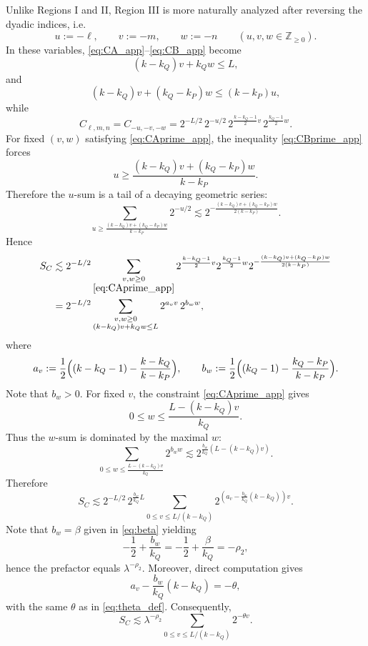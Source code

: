 \documentclass[10pt]{amsart}
\numberwithin{equation}{section}
\theoremstyle{definition}
\theoremstyle{remark}
\theoremstyle{remark}
\newcommand{\Z}{\mathbb{Z}}
\begin{document}
	Unlike Regions I and II,
    Region III is more naturally analyzed after reversing the dyadic indices, i.e.
	\[
	u:=-\ell,\qquad v:=-m,\qquad w:=-n\qquad(u,v,w\in\Z_{\ge 0}).
	\]
	In these variables, \eqref{eq:CA_app}--\eqref{eq:CB_app} become
	\begin{equation}\label{eq:CAprime_app}
		(k-k_Q)v+k_Q w\le L,
	\end{equation}
	and
	\begin{equation}\label{eq:CBprime_app}
		(k-k_Q)v+(k_Q-k_P)w\le (k-k_P)u,
	\end{equation}
	while
	\[
	C_{\ell,m,n}=C_{-u,-v,-w}
	=
	2^{-L/2}\,2^{-u/2}\,
	2^{\frac{k-k_Q-1}{2}v}\,
	2^{\frac{k_Q-1}{2}w}.
	\]
	For fixed $(v,w)$ satisfying \eqref{eq:CAprime_app}, the inequality \eqref{eq:CBprime_app} forces
	\[
	u\ge \frac{(k-k_Q)v+(k_Q-k_P)w}{k-k_P}.
	\]
	Therefore the $u$-sum is a tail of a decaying geometric series:
	\[
	\sum_{u\ge \frac{(k-k_Q)v+(k_Q-k_P)w}{k-k_P}}
	2^{-u/2}
	\lesssim
	2^{-\frac{(k-k_Q)v+(k_Q-k_P)w}{2(k-k_P)}}.
	\]
	Hence
	\begin{align*}
		S_C
		&\lesssim
		2^{-L/2}
		\sum_{\substack{v,w\ge 0\\ \eqref{eq:CAprime_app}}}
		2^{\frac{k-k_Q-1}{2}v}
		2^{\frac{k_Q-1}{2}w}
		2^{-\frac{(k-k_Q)v+(k_Q-k_P)w}{2(k-k_P)}}\\
		&=
		2^{-L/2}
		\sum_{\substack{v,w\ge 0\\ (k-k_Q)v+k_Q w\le L}}
		2^{a_v v}\,2^{b_w w},
	\end{align*}
	where
	\[
	a_v:=\frac12\Bigl((k-k_Q-1)-\frac{k-k_Q}{k-k_P}\Bigr),
	\qquad
	b_w:=\frac12\Bigl((k_Q-1)-\frac{k_Q-k_P}{k-k_P}\Bigr).
	\]
	Note that $b_w>0$. For fixed $v$, the constraint \eqref{eq:CAprime_app} gives
	\[
	0\le w\le \frac{L-(k-k_Q)v}{k_Q}.
	\]
	Thus the $w$-sum is dominated by the maximal $w$:
	\[
	\sum_{0\le w\le \frac{L-(k-k_Q)v}{k_Q}}2^{b_w w}
	\lesssim
	2^{\frac{b_w}{k_Q}(L-(k-k_Q)v)}.
	\]
	Therefore
	\[
	S_C
	\lesssim
	2^{-L/2}\,
	2^{\frac{b_w}{k_Q}L}
	\sum_{0\le v\le L/(k-k_Q)}
	2^{(a_v-\frac{b_w}{k_Q}(k-k_Q))v}.
	\]
	Note that $b_w = \beta$ given in \eqref{eq:beta} yielding
	\[
	-\frac12+\frac{b_w}{k_Q} = -\frac12 + \frac{\beta}{k_Q}=-\rho_2,
	\]
	hence the prefactor equals $\lambda^{-\rho_2}$. Moreover, direct computation gives
	\[
	a_v-\frac{b_w}{k_Q}(k-k_Q)=-\theta,
	\]
	with the same $\theta$ as in \eqref{eq:theta_def}. Consequently,
	\begin{equation}\label{eq:SC_geomsum}
		S_C\lesssim
		\lambda^{-\rho_2}
		\sum_{0\le v\le L/(k-k_Q)}2^{-\theta v}.
	\end{equation}
\end{document}
